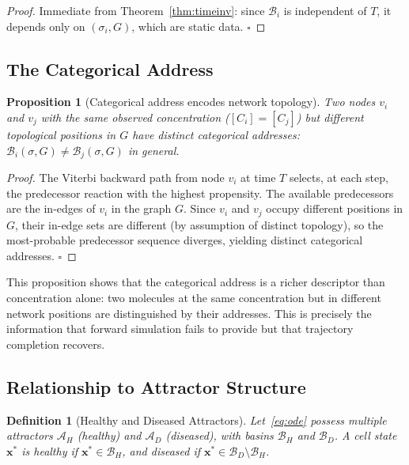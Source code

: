 \documentclass[twocolumn,10pt,a4paper]{article}
\newcommand{\Back}{\mathcal{B}}
\newtheorem{proposition}[theorem]{Proposition}
\newtheorem{definition}[theorem]{Definition}
\begin{document}
\begin{proof}
Immediate from Theorem~\ref{thm:timeinv}: since $\Back_i$ is independent of
$T$, it depends only on $(\sigma_i,G)$, which are static data.  $\square$
\end{proof}

\subsection{The Categorical Address}
\label{sec:backward-address}

\begin{proposition}[Categorical address encodes network topology]
\label{prop:cat-addr-topo}
Two nodes $v_i$ and $v_j$ with the same observed concentration
($[C_i]=[C_j]$) but different topological positions in $G$ have distinct
categorical addresses: $\Back_i(\sigma,G)\neq\Back_j(\sigma,G)$ in general.
\end{proposition}

\begin{proof}
The Viterbi backward path from node $v_i$ at time $T$ selects, at each step,
the predecessor reaction with the highest propensity.  The available
predecessors are the in-edges of $v_i$ in the graph $G$.  Since $v_i$ and
$v_j$ occupy different positions in $G$, their in-edge sets are different
(by assumption of distinct topology), so the most-probable predecessor
sequence diverges, yielding distinct categorical addresses.  $\square$
\end{proof}

This proposition shows that the categorical address is a richer descriptor
than concentration alone: two molecules at the same concentration but in
different network positions are distinguished by their addresses.  This is
precisely the information that forward simulation fails to provide but that
trajectory completion recovers.

\subsection{Relationship to Attractor Structure}
\label{sec:backward-attractor}

\begin{definition}[Healthy and Diseased Attractors]
\label{def:attractors}
Let~\eqref{eq:ode} possess multiple attractors $\mathcal{A}_H$ (healthy) and
$\mathcal{A}_D$ (diseased), with basins $\mathcal{B}_H$ and $\mathcal{B}_D$.
A cell state $\mathbf{x}^*$ is \emph{healthy} if
$\mathbf{x}^*\in\mathcal{B}_H$, and \emph{diseased} if
$\mathbf{x}^*\in\mathcal{B}_D\setminus\mathcal{B}_H$.
\end{definition}
\end{document}
